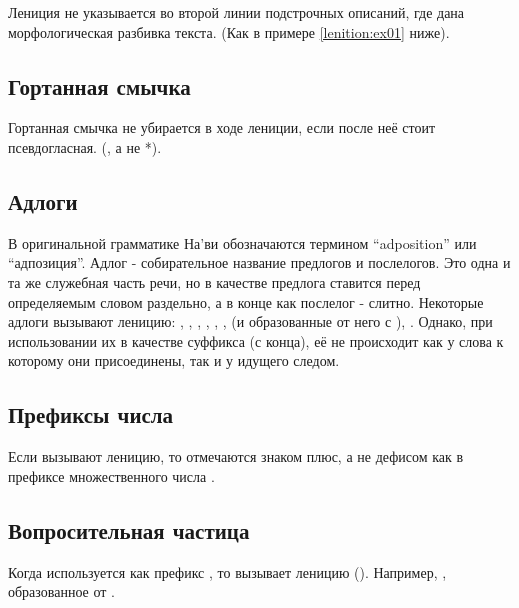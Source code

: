 \noindent Лениция не указывается во второй линии подстрочных описаний, где дана морфологическая разбивка текста. (Как в примере \ref{lenition:ex01} ниже). 

\subsection{Гортанная смычка} Гортанная смычка не убирается в ходе лениции, если после неё стоит псевдогласная. (, а не *).
\label{l-and-s:lenition:pseudovowel}

\subsection{Адлоги} В оригинальной грамматике На'ви обозначаются термином ``adposition'' или ``адпозиция''. Адлог - собирательное название предлогов и послелогов. Это одна и та же служебная часть речи, но в качестве предлога ставится перед определяемым словом раздельно, а в конце как послелог - слитно. Некоторые адлоги вызывают леницию: , , , , , ,
 (и образованные от него  с ), . Однако, при использовании их в качестве суффикса (с конца), её не происходит как у слова к которому они присоединены, так и у идущего следом.

\subsection{Префиксы числа} Если вызывают леницию, то отмечаются знаком плюс, а не дефисом как в префиксе множественного числа . 

\subsection{Вопросительная частица} Когда используется как префикс , то вызывает леницию (). Например,  , образованное от  .

